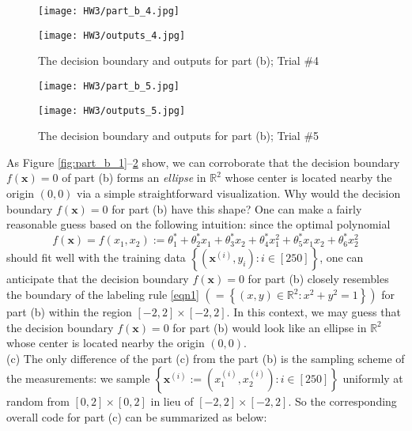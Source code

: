 \documentclass[11pt]{article}
\begin{document}
\begin{figure}
    \begin{minipage}{0.48\textwidth}
        \centering
        \texttt{[image: HW3/part\_b\_4.jpg]}
    \end{minipage}
    \begin{minipage}{0.48\textwidth}
        \centering
        \texttt{[image: HW3/outputs\_4.jpg]}
    \end{minipage}
    \caption{The decision boundary and outputs for part (b); Trial \#4}
    \label{fig:part_b_4}
\end{figure}
\begin{figure}
    \begin{minipage}{0.48\textwidth}
        \centering
        \texttt{[image: HW3/part\_b\_5.jpg]}
    \end{minipage}
    \begin{minipage}{0.48\textwidth}
        \centering
        \texttt{[image: HW3/outputs\_5.jpg]}
    \end{minipage}
    \caption{The decision boundary and outputs for part (b); Trial \#5}
    \label{fig:part_b_5}
\end{figure}

\newpage 

\indent As Figure \ref{fig:part_b_1}--\ref{fig:part_b_5} show, we can corroborate that the decision boundary $f(\mathbf{x}) = 0$ of part (b) forms an \emph{ellipse} in $\mathbb{R}^2$ whose center is located nearby the origin $(0, 0)$ via a simple straightforward visualization. Why would the decision boundary $f(\mathbf{x}) = 0$ for part (b) have this shape? One can make a fairly  reasonable guess based on the following intuition: since the optimal polynomial
\begin{equation}
    \label{eqn3}
    f(\mathbf{x}) = f(x_1, x_2) := \theta_{1}^* + \theta_{2}^* x_1 + \theta_{3}^* x_2 + \theta_{4}^* x_{1}^2 + \theta_{5}^* x_1 x_2 + \theta_{6}^* x_{2}^2
\end{equation}
should fit well with the training data $\left\{ \left( \mathbf{x}^{(i)}, y_i \right) : i \in [250] \right\}$, one can anticipate that the decision boundary $f(\mathbf{x}) = 0$ for part (b) closely resembles the boundary of the labeling rule \eqref{eqn1} $\left( = \left\{ (x, y) \in \mathbb{R}^2 : x^2 + y^2 = 1 \right\} \right)$ for part (b) within the region $\left[ -2, 2 \right] \times \left[ -2, 2 \right]$. In this context, we may guess that the decision boundary $f(\mathbf{x}) = 0$ for part (b) would look like an ellipse in $\mathbb{R}^2$ whose center is located nearby the origin $(0, 0)$. \\ [10pt]
\indent (c) The only difference of the part (c) from the part (b) is the sampling scheme of the measurements: we sample $\left\{ \mathbf{x}^{(i)} := \left( x_{1}^{(i)}, x_{2}^{(i)} \right) : i \in [250] \right\}$ uniformly at random from $\left[ 0, 2 \right] \times \left[ 0, 2 \right]$ in lieu of $\left[ -2, 2 \right] \times \left[ -2, 2 \right]$. So the corresponding overall code for part (c) can be summarized as below:
\end{document}

